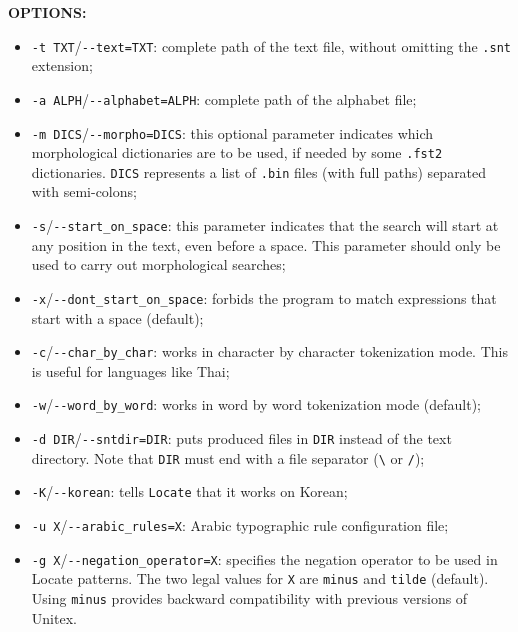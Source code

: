 \bigskip
\noindent \textbf{OPTIONS:}
\begin{itemize}
  \item \verb+-t TXT+/\verb+--text=TXT+: complete path of the text file, without omitting
  the \verb+.snt+ extension;

  \item \verb+-a ALPH+/\verb+--alphabet=ALPH+: complete path of the alphabet
  file;
  
  \item \verb+-m DICS+/\verb+--morpho=DICS+: this optional parameter indicates
  which morphological dictionaries are to be used, if needed by some \verb+.fst2+
  dictionaries. \verb+DICS+ represents a list of \verb+.bin+ files (with full
  paths) separated with semi-colons;
  
  \item \verb+-s+/\verb+--start_on_space+: this parameter indicates that the
  search will start at any position in the text, even before a space. This 
  parameter should only be used to carry out morphological searches;
  
  \item \verb+-x+/\verb+--dont_start_on_space+: forbids the program to match
  expressions that start with a space (default);
  
  \item \verb+-c+/\verb+--char_by_char+: works in character by character
  tokenization mode. This is useful for languages like Thai;
  
  \item \verb+-w+/\verb+--word_by_word+: works in word by word
  tokenization mode (default);
  
  \item \verb+-d DIR+/\verb+--sntdir=DIR+: puts produced files in \verb+DIR+
  instead of the text directory. Note that \verb+DIR+ must end with a file separator
  (\verb+\+ or \verb+/+);
  
  \item \verb+-K+/\verb+--korean+: tells \verb+Locate+ that it works on Korean;

  \item \verb+-u X+/\verb+--arabic_rules=X+: Arabic typographic rule configuration file;

  \item \verb+-g X+/\verb+--negation_operator=X+: specifies the negation operator to be used in
  Locate patterns. The two legal values for \verb+X+ are \verb+minus+ and \verb+tilde+ (default).
  Using \verb+minus+ provides backward compatibility with previous versions of Unitex.
\end{itemize}

